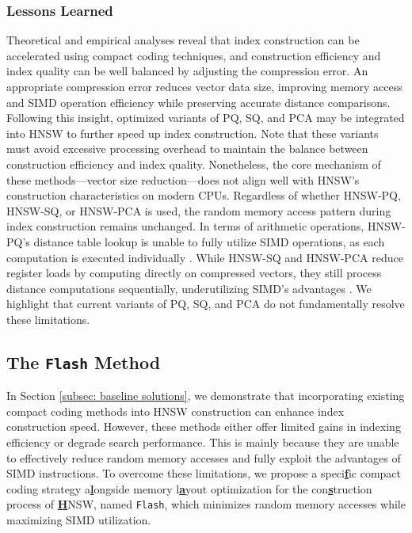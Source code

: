 \subsubsection{\textbf{Lessons Learned}}
\label{subsubsec: lessons learned}
Theoretical and empirical analyses reveal that index construction can be accelerated using compact coding techniques, and construction efficiency and index quality can be well balanced by adjusting the compression error. An appropriate compression error reduces vector data size, improving memory access and SIMD operation efficiency while preserving accurate distance comparisons. Following this insight, optimized variants \cite{OPQ, RaBitQ, WangLKC16, Distill-VQ, ZhangDW14, HeNB21, ScaNN, DeltaPQ, Boufounos12} of PQ, SQ, and PCA may be integrated into HNSW to further speed up index construction. Note that these variants must avoid excessive processing overhead to maintain the balance between construction efficiency and index quality. Nonetheless, the core mechanism of these methods—vector size reduction—does not align well with HNSW's construction characteristics on modern CPUs. Regardless of whether HNSW-PQ, HNSW-SQ, or HNSW-PCA is used, the random memory access pattern during index construction remains unchanged. In terms of arithmetic operations, HNSW-PQ’s distance table lookup is unable to fully utilize SIMD operations, as each computation is executed individually \cite{RaBitQ}. While HNSW-SQ and HNSW-PCA reduce register loads by computing directly on compressed vectors, they still process distance computations sequentially, underutilizing SIMD’s advantages \cite{PQfast}. We highlight that current variants of PQ, SQ, and PCA do not fundamentally resolve these limitations.

\subsection{The \texttt{Flash} Method}
\label{subsec: opt method}
In Section \ref{subsec: baseline solutions}, we demonstrate that incorporating existing compact coding methods into HNSW construction can enhance index construction speed. However, these methods either offer limited gains in indexing efficiency or degrade search performance. This is mainly because they are unable to effectively reduce random memory accesses and fully exploit the advantages of SIMD instructions. To overcome these limitations, we propose a speci\underline{\textbf{f}}ic compact coding strategy a\underline{\textbf{l}}ongside memory l\underline{\textbf{a}}yout optimization for the con\underline{\textbf{s}}truction process of \underline{\textbf{H}}NSW, named \texttt{Flash}, which minimizes random memory accesses while maximizing SIMD utilization.


